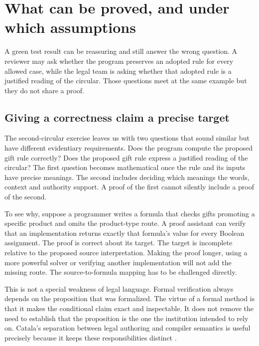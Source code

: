 \chapter{What can be proved, and under which assumptions}
\label{ch:proof}

A green test result can be reassuring and still answer the wrong question. A
reviewer may ask whether the program preserves an adopted rule for every allowed
case, while the legal team is asking whether that adopted rule is a justified
reading of the circular. Those questions meet at the same example but they do
not share a proof.

\section{Giving a correctness claim a precise target}
\label{merge:M03:00}

\label{sec:proof-target}
The second-circular exercise leaves us with two questions that sound similar but
have different evidentiary requirements. Does the program compute the proposed
gift rule correctly? Does the proposed gift rule express a justified reading of
the circular? The first question becomes mathematical once the rule and its
inputs have precise meanings. The second includes deciding which meanings the
words, context and authority support. A proof of the first cannot silently
include a proof of the second.

To see why, suppose a programmer writes a formula that checks gifts promoting a
specific product and omits the product-type route. A proof assistant can verify
that an implementation returns exactly that formula's value for every Boolean
assignment. The proof is correct about its target. The target is incomplete
relative to the proposed source interpretation. Making the proof longer, using a
more powerful solver or verifying another implementation will not add the
missing route. The source-to-formula mapping has to be challenged directly.

This is not a special weakness of legal language. Formal verification always
depends on the proposition that was formalized. The virtue of a formal method
is that it makes the conditional claim exact and inspectable. It does not remove
the need to establish that the proposition is the one the institution intended
to rely on. Catala's separation between legal authoring and compiler semantics
is useful precisely because it keeps these responsibilities distinct
\citep[core language and compilation sections]{catala2021}.

